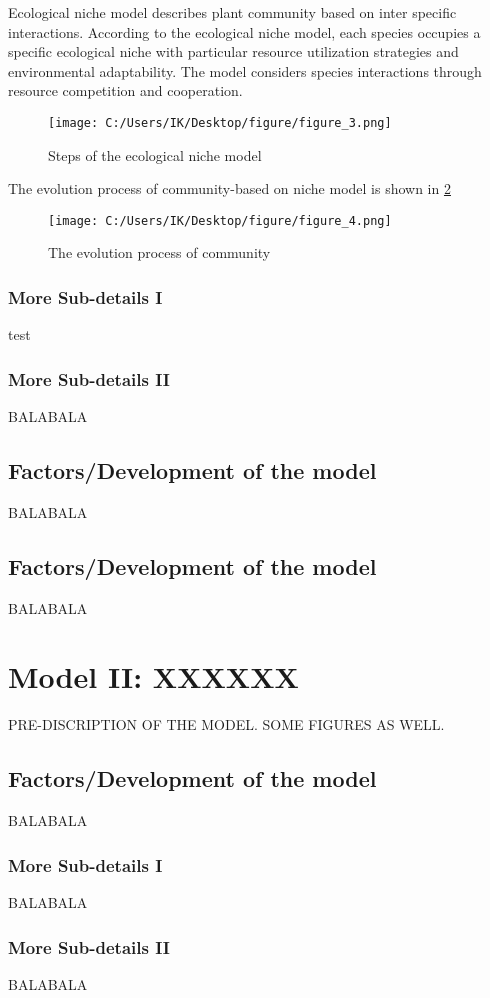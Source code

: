 \documentclass{mcmthesis}
\newcommand{\upcite}[1]{\textsuperscript{\textsuperscript{\cite{#1}}}}
\begin{document}
Ecological niche model describes plant community based on inter specific interactions\upcite{JitSingh2018}.
According to the ecological niche model, each species occupies a specific ecological niche with
particular resource utilization strategies and environmental adaptability. The model considers
species interactions through resource competition and cooperation.\upcite{zotero-114}
\begin{figure}[H]
	\centering
	\texttt{[image: C:/Users/IK/Desktop/figure/figure\_3.png]}
	\caption{Steps of the ecological niche model}
	\label{figure_3}
\end{figure}
The evolution process of community-based on niche model is shown in \ref {figure_4}
\begin{figure}[H]
	\centering
	\texttt{[image: C:/Users/IK/Desktop/figure/figure\_4.png]}
	\caption{The evolution process of community}
	\label{figure_4}
\end{figure}
\subsubsection{More Sub-details I}
test
\subsubsection{More Sub-details II}
BALABALA
\subsection{Factors/Development of the model}
BALABALA
\subsection{Factors/Development of the model}
BALABALA

\section{Model II: XXXXXX}
PRE-DISCRIPTION OF THE MODEL. SOME FIGURES AS WELL.
\subsection{Factors/Development of the model}
BALABALA
\subsubsection{More Sub-details I}
BALABALA
\subsubsection{More Sub-details II}
BALABALA
\end{document}
